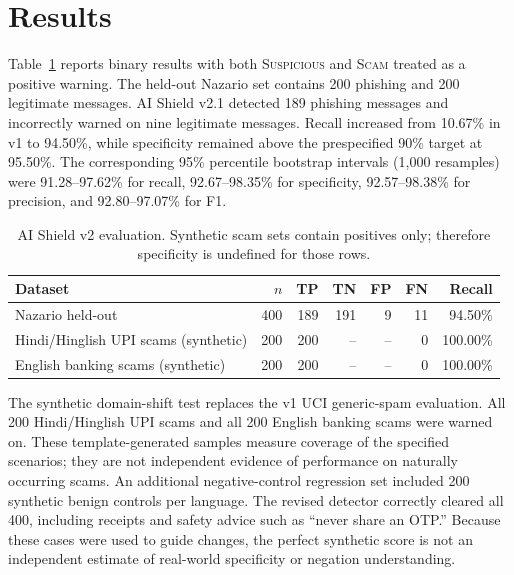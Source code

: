 
\section{Results}

Table~\ref{tab:v2-results} reports binary results with both \textsc{Suspicious} and
\textsc{Scam} treated as a positive warning.  The held-out Nazario set contains
200 phishing and 200 legitimate messages.  AI Shield v2.1 detected 189 phishing
messages and incorrectly warned on nine legitimate messages.  Recall increased
from 10.67\% in v1 to 94.50\%, while specificity remained above the prespecified
90\% target at 95.50\%.  The corresponding 95\% percentile bootstrap intervals
(1,000 resamples) were 91.28--97.62\% for recall, 92.67--98.35\% for
specificity, 92.57--98.38\% for precision, and 92.80--97.07\% for F1.

\begin{table}[ht]
\centering
\caption{AI Shield v2 evaluation. Synthetic scam sets contain positives only;
therefore specificity is undefined for those rows.}
\label{tab:v2-results}
\begin{tabular}{lrrrrrr}
\hline
Dataset & $n$ & TP & TN & FP & FN & Recall \\
\hline
Nazario held-out & 400 & 189 & 191 & 9 & 11 & 94.50\% \\
Hindi/Hinglish UPI scams (synthetic) & 200 & 200 & -- & -- & 0 & 100.00\% \\
English banking scams (synthetic) & 200 & 200 & -- & -- & 0 & 100.00\% \\
\hline
\end{tabular}
\end{table}

The synthetic domain-shift test replaces the v1 UCI generic-spam evaluation.
All 200 Hindi/Hinglish UPI scams and all 200 English banking scams were warned on.
These template-generated samples measure coverage of the specified scenarios;
they are not independent evidence of performance on naturally occurring scams.
An additional negative-control regression set included 200 synthetic benign
controls per language. The revised detector correctly cleared all 400, including
receipts and safety advice such as ``never share an OTP.'' Because these cases were
used to guide changes, the perfect synthetic score is not an independent estimate
of real-world specificity or negation understanding.

